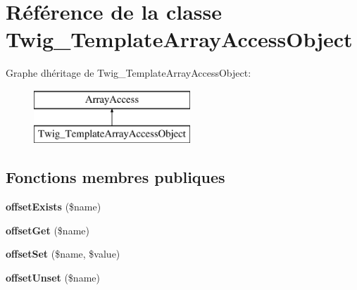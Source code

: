\hypertarget{class_twig___template_array_access_object}{}\section{Référence de la classe Twig\+\_\+\+Template\+Array\+Access\+Object}
\label{class_twig___template_array_access_object}
Graphe d\textquotesingle{}héritage de Twig\+\_\+\+Template\+Array\+Access\+Object\+:\begin{figure}[H]
\begin{center}
\leavevmode
\includegraphics[height=2.000000cm]{class_twig___template_array_access_object}
\end{center}
\end{figure}
\subsection*{Fonctions membres publiques}
\begin{DoxyCompactItemize}
\item 
{\bfseries offset\+Exists} (\$name)\hypertarget{class_twig___template_array_access_object_a14f08d489c790c82c6207fefdd3d1564}{}\label{class_twig___template_array_access_object_a14f08d489c790c82c6207fefdd3d1564}

\item 
{\bfseries offset\+Get} (\$name)\hypertarget{class_twig___template_array_access_object_a3d0a0d05f795eea43971f8ab662b3404}{}\label{class_twig___template_array_access_object_a3d0a0d05f795eea43971f8ab662b3404}

\item 
{\bfseries offset\+Set} (\$name, \$value)\hypertarget{class_twig___template_array_access_object_ae2295f0c920d0d2352749e2acb735fbb}{}\label{class_twig___template_array_access_object_ae2295f0c920d0d2352749e2acb735fbb}

\item 
{\bfseries offset\+Unset} (\$name)\hypertarget{class_twig___template_array_access_object_ac64f6f4bbdf2eaac50e8334a92ea7106}{}\label{class_twig___template_array_access_object_ac64f6f4bbdf2eaac50e8334a92ea7106}

\end{DoxyCompactItemize}
